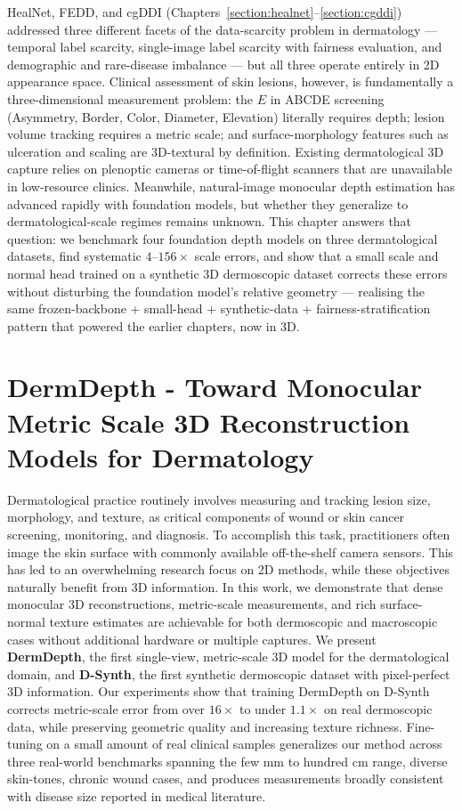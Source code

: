 \documentclass[11pt]{ucthesis}
\begin{document}
HealNet, FEDD, and cgDDI (Chapters~\ref{section:healnet}--\ref{section:cgddi}) addressed three different facets of the data-scarcity problem in dermatology --- temporal label scarcity, single-image label scarcity with fairness evaluation, and demographic and rare-disease imbalance --- but all three operate entirely in 2D appearance space. Clinical assessment of skin lesions, however, is fundamentally a three-dimensional measurement problem: the $E$ in ABCDE screening (Asymmetry, Border, Color, Diameter, Elevation) literally requires depth; lesion volume tracking requires a metric scale; and surface-morphology features such as ulceration and scaling are 3D-textural by definition. Existing dermatological 3D capture relies on plenoptic cameras or time-of-flight scanners that are unavailable in low-resource clinics. Meanwhile, natural-image monocular depth estimation has advanced rapidly with foundation models, but whether they generalize to dermatological-scale regimes remains unknown. This chapter answers that question: we benchmark four foundation depth models on three dermatological datasets, find systematic $4$--$156\times$ scale errors, and show that a small scale and normal head trained on a synthetic 3D dermoscopic dataset corrects these errors without disturbing the foundation model's relative geometry --- realising the same frozen-backbone + small-head + synthetic-data + fairness-stratification pattern that powered the earlier chapters, now in 3D.

\section{DermDepth - Toward Monocular Metric Scale 3D Reconstruction Models for Dermatology}\label{section:dermdepth_abs}

Dermatological practice routinely involves measuring and tracking lesion size, morphology, and texture, as critical components of wound or skin cancer screening, monitoring, and diagnosis. To accomplish this task, practitioners often image the skin surface with commonly available off-the-shelf camera sensors. This has led to an overwhelming research focus on 2D methods, while these objectives naturally benefit from 3D information. In this work, we demonstrate that dense monocular 3D reconstructions, metric-scale measurements, and rich surface-normal texture estimates are achievable for both dermoscopic and macroscopic cases without additional hardware or multiple captures. We present \textbf{DermDepth}, the first single-view, metric-scale 3D model for the dermatological domain, and \textbf{D-Synth}, the first synthetic dermoscopic dataset with pixel-perfect 3D information. Our experiments show that training DermDepth on D-Synth corrects metric-scale error from over $16\times$ to under $1.1\times$ on real dermoscopic data, while preserving geometric quality and increasing texture richness. Fine-tuning on a small amount of real clinical samples generalizes our method across three real-world benchmarks spanning the few mm to hundred cm range, diverse skin-tones, chronic wound cases, and produces measurements broadly consistent with disease size reported in medical literature.
\end{document}
